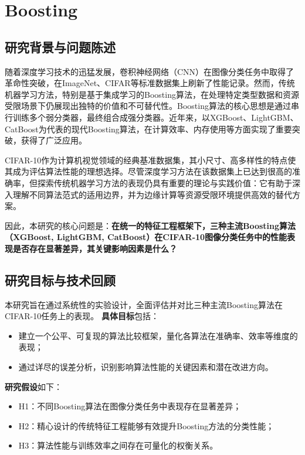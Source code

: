 \documentclass[UTF8]{report}
\theoremstyle{MyLineTheoremStyle} %
\theoremstyle{MyBlockTheoremStyle} %
\theoremstyle{MySubsubsectionStyle} %
\begin{document}
\chapter{Boosting}

\section{研究背景与问题陈述}
随着深度学习技术的迅猛发展，卷积神经网络（CNN）在图像分类任务中取得了革命性突破，在ImageNet、CIFAR等标准数据集上刷新了性能记录。然而，传统机器学习方法，特别是基于集成学习的Boosting算法，在处理特定类型数据和资源受限场景下仍展现出独特的价值和不可替代性。Boosting算法的核心思想是通过串行训练多个弱分类器，最终组合成强分类器。近年来，以XGBoost、LightGBM、CatBoost为代表的现代Boosting算法，在计算效率、内存使用等方面实现了重要突破，获得了广泛应用。

CIFAR-10作为计算机视觉领域的经典基准数据集，其小尺寸、高多样性的特点使其成为评估算法性能的理想选择。尽管深度学习方法在该数据集上已达到很高的准确率，但探索传统机器学习方法的表现仍具有重要的理论与实践价值：它有助于深入理解不同算法范式的适用边界，并为边缘计算等资源受限环境提供高效的替代方案。

因此，本研究的核心问题是：\textbf{在统一的特征工程框架下，三种主流Boosting算法（XGBoost, LightGBM, CatBoost）在CIFAR-10图像分类任务中的性能表现是否存在显著差异，其关键影响因素是什么？}

\section{研究目标与技术回顾}
本研究旨在通过系统性的实验设计，全面评估并对比三种主流Boosting算法在CIFAR-10任务上的表现。
\textbf{具体目标}包括：
\begin{itemize}
    \item 建立一个公平、可复现的算法比较框架，量化各算法在准确率、效率等维度的表现；
    \item 通过详尽的误差分析，识别影响算法性能的关键因素和潜在改进方向。
\end{itemize}
\textbf{研究假设}如下：
\begin{itemize}
    \item H1：不同Boosting算法在图像分类任务中表现存在显著差异；
    \item H2：精心设计的传统特征工程能够有效提升Boosting方法的分类性能；
    \item H3：算法性能与训练效率之间存在可量化的权衡关系。
\end{itemize}
\end{document}
